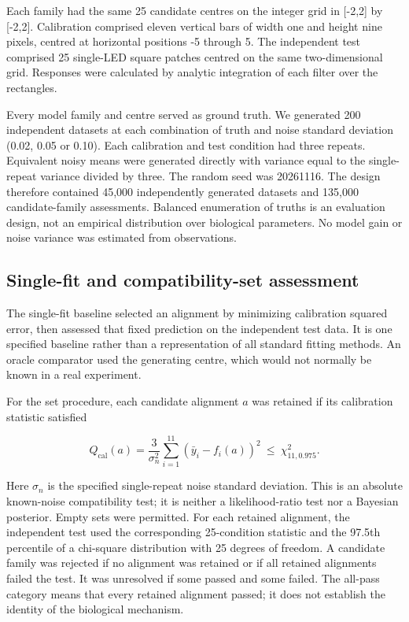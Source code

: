 \documentclass[11pt,letterpaper]{article}
\begin{document}
Each family had the same 25 candidate centres on the integer grid in [-2,2] by [-2,2]. Calibration comprised eleven vertical bars of width one and height nine pixels, centred at horizontal positions -5 through 5. The independent test comprised 25 single-LED square patches centred on the same two-dimensional grid. Responses were calculated by analytic integration of each filter over the rectangles.


Every model family and centre served as ground truth. We generated 200 independent datasets at each combination of truth and noise standard deviation (0.02, 0.05 or 0.10). Each calibration and test condition had three repeats. Equivalent noisy means were generated directly with variance equal to the single-repeat variance divided by three. The random seed was 20261116. The design therefore contained 45,000 independently generated datasets and 135,000 candidate-family assessments. Balanced enumeration of truths is an evaluation design, not an empirical distribution over biological parameters. No model gain or noise variance was estimated from observations.


\subsection{Single-fit and compatibility-set assessment}

The single-fit baseline selected an alignment by minimizing calibration squared error, then assessed that fixed prediction on the independent test data. It is one specified baseline rather than a representation of all standard fitting methods. An oracle comparator used the generating centre, which would not normally be known in a real experiment.


For the set procedure, each candidate alignment $a$ was retained if its calibration statistic satisfied


\[
Q_{\mathrm{cal}}(a)=\frac{3}{\sigma_n^2}\sum_{i=1}^{11}\left(\bar y_i-f_i(a)\right)^2\ \leq\ \chi^2_{11,0.975}.
\]

Here $\sigma_n$ is the specified single-repeat noise standard deviation. This is an absolute known-noise compatibility test; it is neither a likelihood-ratio test nor a Bayesian posterior. Empty sets were permitted. For each retained alignment, the independent test used the corresponding 25-condition statistic and the 97.5th percentile of a chi-square distribution with 25 degrees of freedom. A candidate family was rejected if no alignment was retained or if all retained alignments failed the test. It was unresolved if some passed and some failed. The all-pass category means that every retained alignment passed; it does not establish the identity of the biological mechanism.
\end{document}
